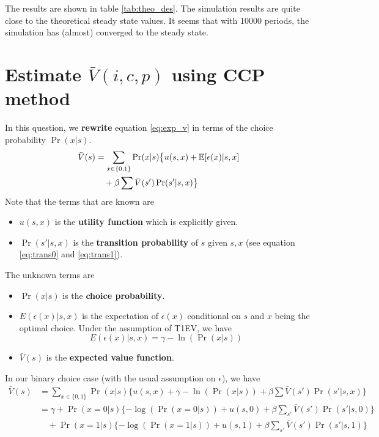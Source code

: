\documentclass[12pt]{article}[margin=1in]
\begin{document}
The results are shown in table \ref{tab:theo_des}. The simulation results are quite close to the theoretical steady state values. It seems that with 10000 periods, the simulation has (almost) converged to the steady state.

\section{Estimate $\bar{V}(i,c,p)$ using CCP method}
In this question, we \textbf{rewrite} equation \ref{eq:exp_v} in terms of the choice probability $\Pr(x|s)$.
\begin{equation}
    \begin{split}
        \bar{V}(s) & =\sum_{x \in \{0,1\}} \Pr(x|s) \big\{ u(s,x) + \mathbb{E}[\epsilon(x)|s,x] \\
                   & \quad + \beta \sum \bar{V}(s') \Pr(s'|s,x) \big\}
    \end{split}
\end{equation}
Note that the terms that are known are
\begin{itemize}
    \item $u(s,x)$ is the \textbf{utility function} which is explicitly given.
    \item $\Pr(s'|s,x)$ is the \textbf{transition probability} of $s$ given $s,x$ (see equation \ref{eq:trans0} and \ref{eq:trans1}).
\end{itemize}
The unknown terms are
\begin{itemize}
    \item $\Pr(x|s)$ is the \textbf{choice probability}.
    \item $E(\epsilon(x)|s,x)$ is the expectation of $\epsilon(x)$ conditional on $s$ and $x$ being the optimal choice. Under the assumption of T1EV, we have
          \begin{equation*}
              E(\epsilon(x)|s,x)=\gamma-\ln(\Pr(x|s))
          \end{equation*}
    \item $\bar{V}(s)$ is the \textbf{expected value function}.
\end{itemize}
In our binary choice case (with the usual assumption on $\epsilon$), we have
\begin{equation}\label{eq:exp_v_bin_ccp}
    \begin{split}
        \bar{V}(s) & =\sum_{x \in \{0,1\}} \Pr(x|s) \big\{ u(s,x) + \gamma-\ln(\Pr(x|s)) +\beta \sum \bar{V}(s') \Pr(s'|s,x) \big\} \\
                   & =\gamma + \Pr(x=0|s) \{-\log(\Pr(x=0|s))+u(s,0) + \beta \sum_{s'} \bar{V}(s') \Pr(s'|s,0)\}                    \\
                   & \quad + \Pr(x=1|s) \{-\log(\Pr(x=1|s))+u(s,1) + \beta \sum_{s'} \bar{V}(s') \Pr(s'|s,1)\}                      \\
    \end{split}
\end{equation}
\end{document}
